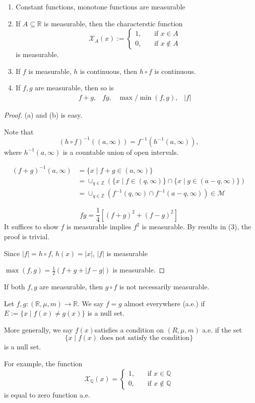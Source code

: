 \begin{proposition}
\begin{enumerate}
\item
Constant functions, monotone functions are measurable
\item
If $A\subseteq\mathbb{R}$ is measurable, then the characterstic function
\[
\mathcal{X}_A(x):=\left\{
\begin{aligned}
1,&\quad\text{if $x\in A$}\\
0,&\quad\text{if $x\notin A$}
\end{aligned}
\right.
\]
is measurable.
\item
If $f$ is measurable, $h$ is continuous, then $h\circ f$ is continuous.
\item
If $f,g$ are measurable, then so is 
\[
\begin{array}{llll}
f+g,&fg,&\max/\min(f,g),&|f|
\end{array}
\]
\end{enumerate}
\end{proposition}
\begin{proof}
(a) and (b) is easy.

Note that
\[
(h\circ f)^{-1}((a,\infty)) = f^{-1}(h^{-1}(a,\infty)),
\]
where $h^{-1}(a,\infty)$ is a countable union of open intervals.

\begin{align*}
(f+g)^{-1}(a,\infty) &= \{x\mid f+g\in(a,\infty)\}\\
&=
\cup_{q\in\mathbb{Z}}(\{x\mid f\in (q,\infty)\}\cap\{x\mid g\in(a-q,\infty)\})\\
&=\cup_{q\in\mathbb{Z}}(f^{-1}(q,\infty)\cap f^{-1}(a-q,\infty))\in\mathcal{M}
\end{align*}

\[
fg = \frac{1}{4}[(f+g)^2+(f-g)^2]
\]
It suffices to show $f$ is measurable implies $f^2$ is measurable. By results in (3), the proof is trivial.


Since $|f| = h\circ f$, $h(x)=|x|$, $|f|$ is measurable

$\max(f,g)=\frac{1}{2}(f+g+|f-g|)$ is measurable.
\end{proof}


\begin{remark}
If both $f,g$ are measurable, then $g\circ f$ is not necessarily measurable.
\end{remark}


\begin{definition}
Let $f,g:(\mathbb{R},\mu,m)\to\mathbb{R}$.
We say $f=g$ almost everywhere (a.e.)
if $E:=\{x\mid f(x)\ne g(x)\}$ is a null set.

More generally, we say $f(x) $satisfies a condition on $(R,\mu,m)$ a.e. if the set
\[
\{x\mid\text{$f(x)$ does not satisfy the condition}\}
\]
is a null set.
\end{definition}
For example, the function
\[
\mathcal{X}_{\mathbb{Q}}(x)=
\left\{
\begin{aligned}
1,&\quad\text{if $x\in\mathbb{Q}$}\\
0,&\quad\text{if $x\notin\mathbb{Q}$}
\end{aligned}
\right.
\]
is equal to zero function a.e.

